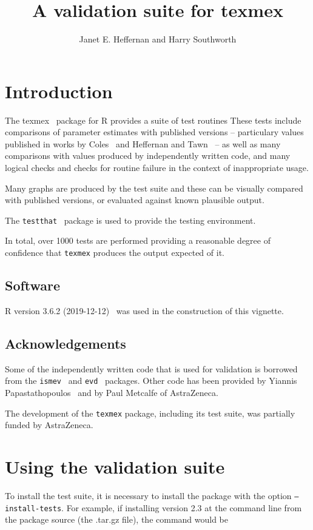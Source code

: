 \documentclass[a4paper]{article}\usepackage[]{graphicx}\usepackage[]{color}
\begin{document}
\title{A validation suite for texmex}
\author{Janet E. Heffernan and Harry Southworth}
\maketitle%
\tableofcontents



\section{Introduction}
The texmex~\cite{texmex} package for R provides a suite of test routines
These tests include comparisons of
parameter estimates with published versions -- particulary values published in
works by Coles~\cite{coles} and Heffernan and Tawn~\cite{heffernanTawn} -- as well
as many comparisons with values produced by independently written code, and many
logical checks and checks for routine failure in the context of inappropriate
usage.

Many graphs are produced by the test suite and these can be visually compared
with published versions, or evaluated against known plausible output.

The {\tt testthat}~\cite{testthat} package is used to provide the testing environment.

In total, over 1000 tests are performed providing a reasonable degree of
confidence that {\tt texmex} produces the output expected of it.

\subsection{Software}
R version 3.6.2 (2019-12-12)~\cite{R} was used in the construction of this
vignette.

\subsection{Acknowledgements}
Some of the independently written code that is used for validation is borrowed
from the {\tt ismev}~\cite{coles} and {\tt evd}~\cite{evd} packages. Other code has been provided by Yiannis Papastathopoulos~\cite{yiannis} and by Paul Metcalfe of
AstraZeneca.

The development of the {\tt texmex} package, including its test suite, was
partially funded by AstraZeneca.

\section{Using the validation suite}
To install the test suite, it is necessary to install the package with the option
{\tt --install-tests}. For example, if installing version 2.3 at the command
line from the package source (the .tar.gz file), the command would be
\end{document}
